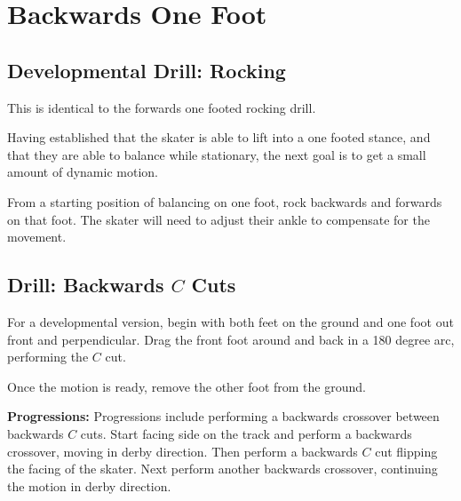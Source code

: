 \section{Backwards One Foot}
\label{sec:one_foot/backwards}



\subsection*{Developmental Drill: Rocking}
\label{drill:one_foot/backwards/rocking}
This is identical to the forwards one footed rocking drill. 

Having established that the skater is able to lift into a one footed stance, and that they are able to balance while stationary, the next goal is to get a small amount of dynamic motion. 

From a starting position of balancing on one foot, rock backwards and forwards on that foot. 
The skater will need to adjust their ankle to compensate for the movement.



\subsection*{Drill: Backwards $C$ Cuts}
\label{drill:one_foot/backwards/c_cut}

For a developmental version, begin with both feet on the ground and one foot out front and perpendicular.  
Drag the front foot around and back in a 180 degree arc, performing the $C$ cut. 

Once the motion is ready, remove the other foot from the ground. 



{\bf Progressions:}
Progressions include performing a backwards crossover between backwards $C$ cuts.
Start facing side on the track and perform a backwards crossover, moving in derby direction. 
Then perform a backwards $C$ cut flipping the facing of the skater.    
Next perform another backwards crossover, continuing the motion in derby direction.


